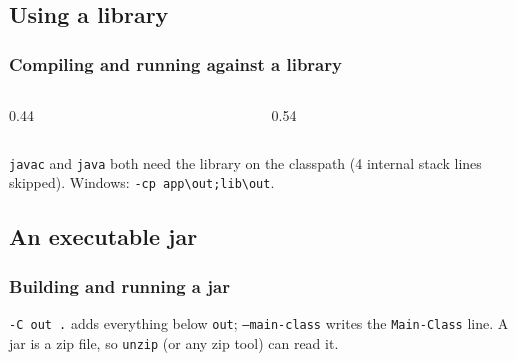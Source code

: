 \documentclass[aspectratio=169,10pt,compress]{beamer}
\begin{document}
\subsection[Library]{Using a library}




\begin{frame}[t,fragile] \frametitle{Compiling and running against a library}
  \vspace{-0.5cm}
  \begin{columns}[T]
    \begin{column}{0.44\textwidth}
    \end{column}
    \begin{column}{0.54\textwidth}
    \end{column}
  \end{columns}

  \vspace{0.2em}
  \small \texttt{javac} and \texttt{java} both need the library on the classpath (4 internal stack lines skipped).
  Windows: \texttt{-cp app\textbackslash out;lib\textbackslash out}.
\end{frame}


\subsection[Jar]{An executable jar}




\begin{frame}[t,fragile] \frametitle{Building and running a jar}

  \vspace{0.2em}
  \small \texttt{-C out .} adds everything below \texttt{out}; \texttt{--main-class} writes the \texttt{Main-Class} line.
  A jar is a zip file, so \texttt{unzip} (or any zip tool) can read it.
\end{frame}
\end{document}
